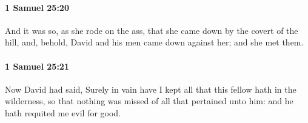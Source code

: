 		\paragraph{1 Samuel 25:20} %
			\label{1SAMUEL-25-20}

			And it was so, as she rode on the ass, that she came down by the covert of the hill, and, behold, David and his men came down against her; and she met them.


		\paragraph{1 Samuel 25:21} %
			\label{1SAMUEL-25-21}

			Now David had said, Surely in vain have I kept all that this fellow hath in the wilderness, so that nothing was missed of all that pertained unto him: and he hath requited me evil for good.


